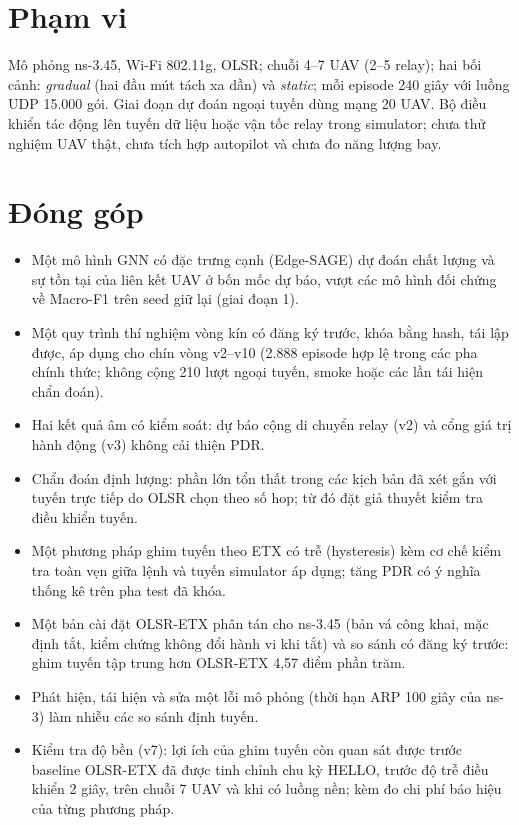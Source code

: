 \documentclass[12pt,a4paper]{report}
\begin{document}
\section{Phạm vi}
Mô phỏng ns-3.45, Wi-Fi 802.11g, OLSR; chuỗi 4--7 UAV (2--5 relay); hai bối cảnh: \emph{gradual} (hai đầu mút tách xa dần) và \emph{static}; mỗi episode 240 giây với luồng UDP 15.000 gói. Giai đoạn dự đoán ngoại tuyến dùng mạng 20 UAV. Bộ điều khiển tác động lên tuyến dữ liệu hoặc vận tốc relay trong simulator; chưa thử nghiệm UAV thật, chưa tích hợp autopilot và chưa đo năng lượng bay.

\section{Đóng góp}
\begin{itemize}
  \item Một mô hình GNN có đặc trưng cạnh (Edge-SAGE) dự đoán chất lượng và sự tồn tại của liên kết UAV ở bốn mốc dự báo, vượt các mô hình đối chứng về Macro-F1 trên seed giữ lại (giai đoạn 1).
  \item Một quy trình thí nghiệm vòng kín có đăng ký trước, khóa bằng hash, tái lập được, áp dụng cho chín vòng v2--v10 (2.888 episode hợp lệ trong các pha chính thức; không cộng 210 lượt ngoại tuyến, smoke hoặc các lần tái hiện chẩn đoán).
  \item Hai kết quả âm có kiểm soát: dự báo cộng di chuyển relay (v2) và cổng giá trị hành động (v3) không cải thiện PDR.
  \item Chẩn đoán định lượng: phần lớn tổn thất trong các kịch bản đã xét gắn với tuyến trực tiếp do OLSR chọn theo số hop; từ đó đặt giả thuyết kiểm tra điều khiển tuyến.
  \item Một phương pháp ghim tuyến theo ETX có trễ (hysteresis) kèm cơ chế kiểm tra toàn vẹn giữa lệnh và tuyến simulator áp dụng; tăng PDR có ý nghĩa thống kê trên pha test đã khóa.
  \item Một bản cài đặt OLSR-ETX phân tán cho ns-3.45 (bản vá công khai, mặc định tắt, kiểm chứng không đổi hành vi khi tắt) và so sánh có đăng ký trước: ghim tuyến tập trung hơn OLSR-ETX 4,57 điểm phần trăm.
  \item Phát hiện, tái hiện và sửa một lỗi mô phỏng (thời hạn ARP 100 giây của ns-3) làm nhiễu các so sánh định tuyến.
  \item Kiểm tra độ bền (v7): lợi ích của ghim tuyến còn quan sát được trước baseline OLSR-ETX đã được tinh chỉnh chu kỳ HELLO, trước độ trễ điều khiển 2 giây, trên chuỗi 7 UAV và khi có luồng nền; kèm đo chi phí báo hiệu của từng phương pháp.

\end{itemize}
\end{document}
